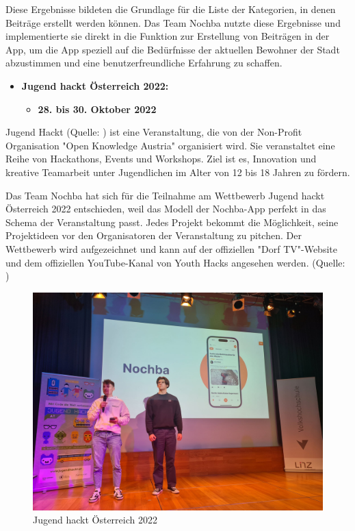 Diese Ergebnisse bildeten die Grundlage für die Liste der Kategorien, in denen Beiträge erstellt werden können. Das Team Nochba nutzte diese Ergebnisse und implementierte sie direkt in die Funktion zur Erstellung von Beiträgen in der App, um die App speziell auf die Bedürfnisse der aktuellen Bewohner der Stadt abzustimmen und eine benutzerfreundliche Erfahrung zu schaffen.

\begin{itemize}
    \item \textbf{Jugend hackt Österreich 2022:}
          \begin{itemize}
              \item \textbf{28. bis 30. Oktober 2022}
          \end{itemize}
\end{itemize}

Jugend Hackt (Quelle: ) ist eine Veranstaltung, die von der Non-Profit Organisation "Open Knowledge Austria" organisiert wird. Sie veranstaltet eine Reihe von Hackathons, Events und Workshops. Ziel ist es, Innovation und kreative Teamarbeit unter Jugendlichen im Alter von 12 bis 18 Jahren zu fördern.

Das Team Nochba hat sich für die Teilnahme am Wettbewerb Jugend hackt Österreich 2022 entschieden, weil das Modell der Nochba-App perfekt in das Schema der Veranstaltung passt. Jedes Projekt bekommt die Möglichkeit, seine Projektideen vor den Organisatoren der Veranstaltung zu pitchen. Der Wettbewerb wird aufgezeichnet und kann auf der offiziellen "Dorf TV"-Website und dem offiziellen YouTube-Kanal von Youth Hacks angesehen werden. (Quelle: )


\begin{figure}[H]
    \centering
    \includegraphics[width=1\textwidth]{pics/JugendHackt.jpeg}
    \caption{Jugend hackt Österreich 2022}
    \label{fig:jugendHackt}
\end{figure}

